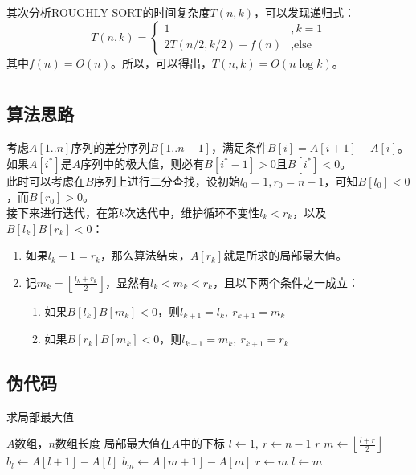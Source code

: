 \documentclass[UTF8]{ctexart}
\begin{document}
其次分析ROUGHLY-SORT的时间复杂度$T(n, k)$，可以发现递归式：
\begin{equation*}
    T(n, k) = 
    \begin{cases}
        1 &, k = 1 \\
        2T(n/2, k/2) + f(n) &, \text{else}
    \end{cases}
\end{equation*}
其中$f(n) = O(n)$。所以，可以得出，$T(n, k) = O(n\log k)$。

\section{} %
\subsection*{算法思路}
考虑$A[1..n]$序列的差分序列$B[1..n-1]$，满足条件$B[i] = A[i+1] - A[i]$。 \\
如果$A[i^*]$是$A$序列中的极大值，则必有$B[i^*-1] > 0$且$B[i^*] < 0$。 \\
此时可以考虑在$B$序列上进行二分查找，设初始$l_0=1, r_0=n-1$，可知$B[l_0]<0$，而$B[r_0]>0$。 \\
接下来进行迭代，在第$k$次迭代中，维护循环不变性$l_k < r_k$，以及$B[l_k]B[r_k] < 0$：
\begin{enumerate}
    \item 如果$l_k+1=r_k$，那么算法结束，$A[r_k]$就是所求的局部最大值。
    \item 记$m_k = \left\lfloor\frac{l_k+r_k}{2}\right\rfloor$，显然有$l_k < m_k < r_k$，且以下两个条件之一成立：
        \begin{enumerate}
            \item 如果$B[l_k]B[m_k] < 0$，则$l_{k+1} = l_k,\ r_{k+1} = m_k$
            \item 如果$B[r_k]B[m_k] < 0$，则$l_{k+1} = m_k,\ r_{k+1} = r_k$
        \end{enumerate}
\end{enumerate}

\subsection*{伪代码}
\begin{algorithm}
    \caption{求局部最大值}
    \begin{algorithmic}[1]
        \Require $A$数组，$n$数组长度
        \Ensure 局部最大值在$A$中的下标
            \State $l\gets 1,\ r\gets n-1$
                    \State \Return $r$
                \Else
                    \State $m\gets \left\lfloor\frac{l+r}{2}\right\rfloor$
                    \State $b_l \gets A[l+1]-A[l]$
                    \State $b_m \gets A[m+1]-A[m]$
                        \State $r \gets m$
                    \Else
                        \State $l \gets m$
                    \EndIf
                \EndIf
            \EndWhile
        \EndFunction
    \end{algorithmic}
\end{algorithm}
\end{document}
